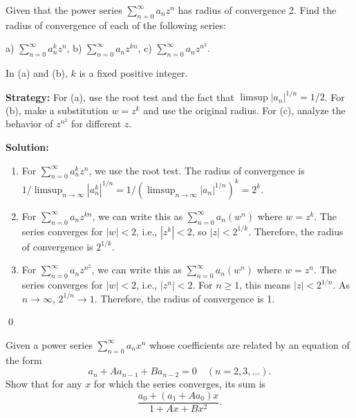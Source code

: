 \begin{problembox}
\begin{problemstatement}
Given that the power series \( \sum_{n=0}^{\infty} a_nz^n \) has radius of convergence 2. Find the radius of convergence of each of the following series:

a) \( \sum_{n=0}^{\infty} a_n^k z^n \),    b) \( \sum_{n=0}^{\infty} a_nz^{kn} \),    c) \( \sum_{n=0}^{\infty} a_nz^{n^2} \).

In (a) and (b), \( k \) is a fixed positive integer.
\end{problemstatement}
\end{problembox}

\noindent\textbf{Strategy:} For (a), use the root test and the fact that \( \limsup |a_n|^{1/n} = 1/2 \). For (b), make a substitution \( w = z^k \) and use the original radius. For (c), analyze the behavior of \( z^{n^2} \) for different \( z \).

\bigskip\noindent\textbf{Solution:}
\begin{enumerate}[label=(\alph*)]
\item For \( \sum_{n=0}^{\infty} a_n^k z^n \), we use the root test. The radius of convergence is \( 1/\limsup_{n\to\infty} |a_n^k|^{1/n} = 1/(\limsup_{n\to\infty} |a_n|^{1/n})^k = 2^k \).

\item For \( \sum_{n=0}^{\infty} a_nz^{kn} \), we can write this as \( \sum_{n=0}^{\infty} a_n(w^n) \) where \( w = z^k \). The series converges for \( |w| < 2 \), i.e., \( |z^k| < 2 \), so \( |z| < 2^{1/k} \). Therefore, the radius of convergence is \( 2^{1/k} \).

\item For \( \sum_{n=0}^{\infty} a_nz^{n^2} \), we can write this as \( \sum_{n=0}^{\infty} a_n(w^n) \) where \( w = z^n \). The series converges for \( |w| < 2 \), i.e., \( |z^n| < 2 \). For \( n \geq 1 \), this means \( |z| < 2^{1/n} \). As \( n \to \infty \), \( 2^{1/n} \to 1 \). Therefore, the radius of convergence is 1.
\end{enumerate}\qed


\begin{problembox}
\begin{problemstatement}
Given a power series \( \sum_{n=0}^{\infty} a_nx^n \) whose coefficients are related by an equation of the form
\[ a_n + Aa_{n-1} + Ba_{n-2} = 0 \quad (n = 2, 3, \ldots). \]
Show that for any \( x \) for which the series converges, its sum is
\[ \frac{a_0 + (a_1 + Aa_0)x}{1 + Ax + Bx^2}. \]
\end{problemstatement}
\end{problembox}

